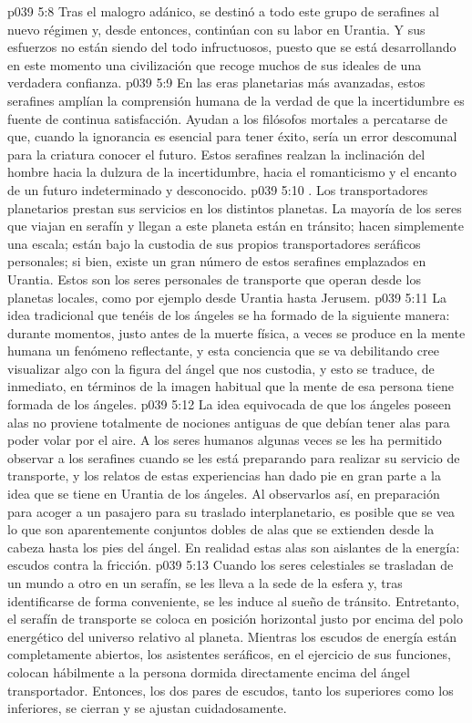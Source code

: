 \vs p039 5:8 Tras el malogro adánico, se destinó a todo este grupo de serafines al nuevo régimen y, desde entonces, continúan con su labor en Urantia. Y sus esfuerzos no están siendo del todo infructuosos, puesto que se está desarrollando en este momento una civilización que recoge muchos de sus ideales de una verdadera confianza.
\vs p039 5:9 En las eras planetarias más avanzadas, estos serafines amplían la comprensión humana de la verdad de que la incertidumbre es fuente de continua satisfacción. Ayudan a los filósofos mortales a percatarse de que, cuando la ignorancia es esencial para tener éxito, sería un error descomunal para la criatura conocer el futuro. Estos serafines realzan la inclinación del hombre hacia la dulzura de la incertidumbre, hacia el romanticismo y el encanto de un futuro indeterminado y desconocido.
\vs p039 5:10 . Los transportadores planetarios prestan sus servicios en los distintos planetas. La mayoría de los seres que viajan en serafín y llegan a este planeta están en tránsito; hacen simplemente una escala; están bajo la custodia de sus propios transportadores seráficos personales; si bien, existe un gran número de estos serafines emplazados en Urantia. Estos son los seres personales de transporte que operan desde los planetas locales, como por ejemplo desde Urantia hasta Jerusem.
\vs p039 5:11 \pc La idea tradicional que tenéis de los ángeles se ha formado de la siguiente manera: durante momentos, justo antes de la muerte física, a veces se produce en la mente humana un fenómeno reflectante, y esta conciencia que se va debilitando cree visualizar algo con la figura del ángel que nos custodia, y esto se traduce, de inmediato, en términos de la imagen habitual que la mente de esa persona tiene formada de los ángeles.
\vs p039 5:12 La idea equivocada de que los ángeles poseen alas no proviene totalmente de nociones antiguas de que debían tener alas para poder volar por el aire. A los seres humanos algunas veces se les ha permitido observar a los serafines cuando se les está preparando para realizar su servicio de transporte, y los relatos de estas experiencias han dado pie en gran parte a la idea que se tiene en Urantia de los ángeles. Al observarlos así, en preparación para acoger a un pasajero para su traslado interplanetario, es posible que se vea lo que son aparentemente conjuntos dobles de alas que se extienden desde la cabeza hasta los pies del ángel. En realidad estas alas son aislantes de la energía: escudos contra la fricción.
\vs p039 5:13 \pc Cuando los seres celestiales se trasladan de un mundo a otro en un serafín, se les lleva a la sede de la esfera y, tras identificarse de forma conveniente, se les induce al sueño de tránsito. Entretanto, el serafín de transporte se coloca en posición horizontal justo por encima del polo energético del universo relativo al planeta. Mientras los escudos de energía están completamente abiertos, los asistentes seráficos, en el ejercicio de sus funciones, colocan hábilmente a la persona dormida directamente encima del ángel transportador. Entonces, los dos pares de escudos, tanto los superiores como los inferiores, se cierran y se ajustan cuidadosamente.
